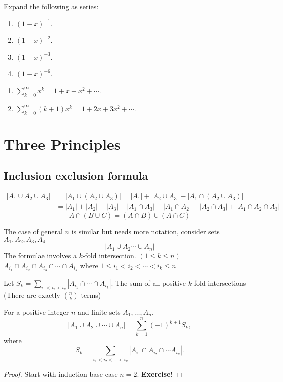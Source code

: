 \documentclass[10pt, a4paper]{article}
\begin{document}
\begin{example}
    Expand the following as series:
    \begin{enumerate}[label = (\roman*)]
        \item $(1 - x) ^ {-1}$.
        \item $(1 - x) ^ {-2}$.
        \item $(1 - x) ^ {-3}$.
        \item $(1 - x) ^ {-6}$.
    \end{enumerate}
    \begin{enumerate}[label = (\roman*)]
        \item $\sum_{k = 0}^{\infty}x ^ k = 1 + x + x ^ 2 + \dotsi$.
        \item $\sum_{k = 0}^{\infty}(k + 1)x ^ k = 1 + 2x + 3x ^ 2 + \dotsi$.
    \end{enumerate}
\end{example}

\section{Three Principles}

\subsection{Inclusion exclusion formula}
\begin{align*}
|A_1 \cup A_2 \cup A_3| &= |A_1 \cup (A_2 \cup A_3)| = |A_1| + |A_2 \cup A_3| - |A_1 \cap (A_2 \cup A_3)| \\
&= |A_1| + |A_2| + |A_3| - |A_1 \cap A_3| - |A_1 \cap A_2| - |A_2 \cap A_3| + |A_1 \cap A_2 \cap A_3|
\end{align*}
\[
A \cap (B \cup C) = (A \cap B) \cup (A \cap C)
\]

The case of general $n$ is similar but needs more notation,
consider sets $A_1, A_2, A_3, A_4$
\[
|A_1 \cup A_2 \dotsi \cup A_n|
\]
The formulae involves a $k$-fold intersection.
$(1 \leq k \leq n)$ $A_{i_1} \cap A_{i_2} \cap A_{i_3} \cap \dotsi \cap A_{i_k}$ where $1 \leq i_1 < i_2 < \dotsi < i_k \leq n$

Let $S_k = \sum_{i_1 < i_2 < i_k}|A_{i_1} \cap \dotsi \cap A_{i_k}|$.
The sum of all positive $k$-fold intersections
(There are exactly $\binom{n}{k}$ terms)

\begin{theorem}
    For a positive integer $n$ and finite sets
    $A_1, \dotsc, A_n$,
    \[
    |A_1 \cup A_2 \cup \dotsi \cup A_n| = \sum_{k = 1}^{n}(-1) ^ {k + 1}S_k,
    \]
    where
    \[
    S_k = \sum_{i_1 < i_2 < \dotsi < i_k}|A_{i_1} \cap A_{i_2} \cap \dotsi A_{i_k}|.
    \]
    \begin{proof}
        Start with induction base case $n = 2$.
        \large\textbf{Exercise!}
    \end{proof}
    
\end{theorem}
\end{document}
